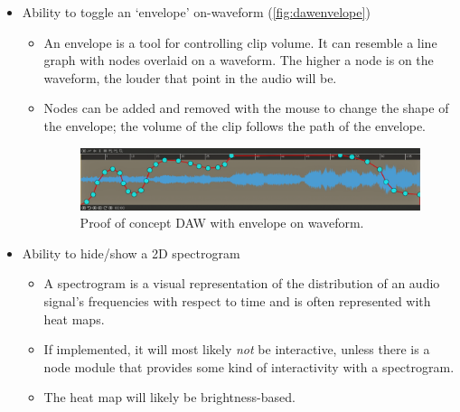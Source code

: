 \documentclass[manuscript,screen,review]{acmart}
\begin{document}
\begin{itemize}
    \item Ability to toggle an `envelope' on-waveform (\autoref{fig:dawenvelope})
    \begin{itemize}
        \item An envelope is a tool for controlling clip volume. It can resemble a line graph with nodes overlaid on a waveform. The higher a node is on the waveform, the louder that point in the audio will be.
        \item Nodes can be added and removed with the mouse to change the shape of the envelope; the volume of the clip follows the path of the envelope.
    \begin{figure}[h]
        \centering
        \includegraphics[width=1\linewidth]{proposal/images/daw-envelope-1.png}
        \caption{Proof of concept DAW with envelope on waveform.}
        \label{fig:dawenvelope}
    \end{figure}
    \end{itemize}

    
    \item Ability to hide/show a 2D spectrogram
    \begin{itemize}
        \item A spectrogram is a visual representation of the distribution of an audio signal's frequencies with respect to time and is often represented with heat maps.
        \item If implemented, it will most likely \textit{not} be interactive, unless there is a node module that provides some kind of interactivity with a spectrogram.
        \item The heat map will likely be brightness-based.
    \end{itemize}
    

\end{itemize}
\end{document}
